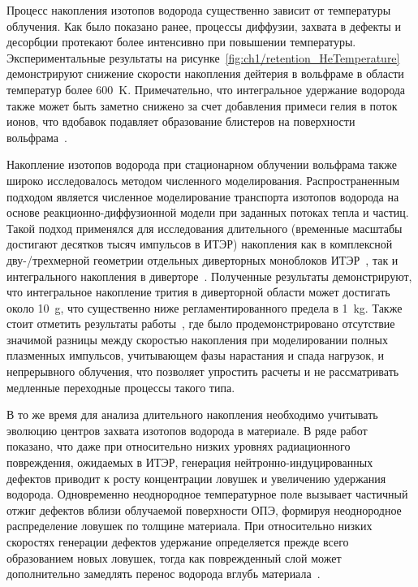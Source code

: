 Процесс накопления изотопов водорода существенно зависит от температуры облучения. Как было показано ранее, процессы диффузии, захвата в дефекты и десорбции протекают более интенсивно при повышении температуры. Экспериментальные результаты на рисунке~\cref{fig:ch1/retention_HeTemperature} демонстрируют снижение скорости накопления дейтерия в вольфраме в области температур более \SI{600}{\kelvin}. Примечательно, что интегральное удержание водорода также может быть заметно снижено за счет добавления примеси гелия в поток ионов, что вдобавок подавляет образование блистеров на поверхности вольфрама~\cite{Baldwin2011}.

Накопление изотопов водорода при стационарном облучении вольфрама также широко исследовалось методом численного моделирования. Распространенным подходом является численное моделирование транспорта изотопов водорода на основе реакционно-диффузионной модели при заданных потоках тепла и частиц. Такой подход применялся для исследования длительного (временные масштабы достигают десятков тысяч импульсов в ИТЭР) накопления как в комплексной дву-/трехмерной геометрии отдельных диверторных моноблоков ИТЭР~\cite{Delaporte-Mathurin2019,Hodille2021_2}, так и интегрального накопления в диверторе~\cite{Delaporte-Mathurin2020, Delaporte-Mathurin2021_2}. Полученные результаты демонстрируют, что интегральное накопление трития в диверторной области может достигать около \SI{10}{\gram}, что существенно ниже регламентированного предела в \SI{1}{\kilogram}. Также стоит отметить результаты работы~\cite{Hodille2021_2}, где было продемонстрировано отсутствие значимой разницы между скоростью накопления при моделировании полных плазменных импульсов, учитывающем фазы нарастания и спада нагрузок, и непрерывного облучения, что позволяет упростить расчеты и не рассматривать медленные переходные процессы такого типа.

В то же время для анализа длительного накопления необходимо учитывать эволюцию центров захвата изотопов водорода в материале. В ряде работ показано, что даже при относительно низких уровнях радиационного повреждения, ожидаемых в ИТЭР, генерация нейтронно-индуцированных дефектов приводит к росту концентрации ловушек и увеличению удержания водорода. Одновременно неоднородное температурное поле вызывает частичный отжиг дефектов вблизи облучаемой поверхности ОПЭ, формируя неоднородное распределение ловушек по толщине материала. При относительно низких скоростях генерации дефектов удержание определяется прежде всего образованием новых ловушек, тогда как поврежденный слой может дополнительно замедлять перенос водорода вглубь материала~\cite{Dark2024,Hodille2026}.

